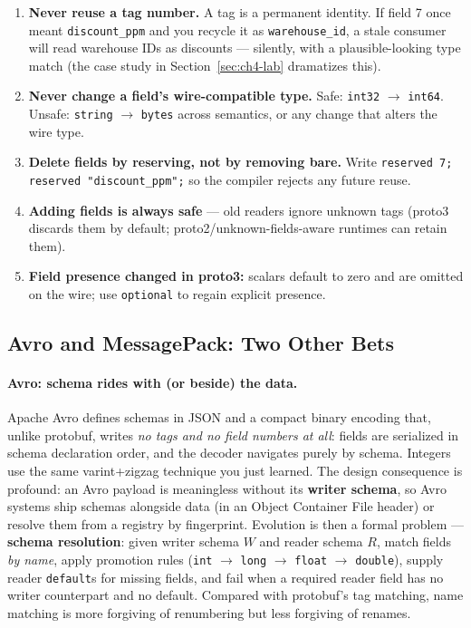 \begin{enumerate}
  \item \textbf{Never reuse a tag number.} A tag is a permanent identity. If field 7
        once meant \texttt{discount\_ppm} and you recycle it as
        \texttt{warehouse\_id}, a stale consumer will read warehouse IDs as discounts
        --- silently, with a plausible-looking type match (the case study in
        Section~\ref{sec:ch4-lab} dramatizes this).
  \item \textbf{Never change a field's wire-compatible type.} Safe: \texttt{int32}
        $\to$ \texttt{int64}. Unsafe: \texttt{string} $\to$ \texttt{bytes} across
        semantics, or any change that alters the wire type.
  \item \textbf{Delete fields by reserving, not by removing bare.} Write
        \texttt{reserved 7; reserved "discount\_ppm";} so the compiler rejects any
        future reuse.
  \item \textbf{Adding fields is always safe} --- old readers ignore unknown tags
        (proto3 discards them by default; proto2/unknown-fields-aware runtimes can
        retain them).
  \item \textbf{Field presence changed in proto3:} scalars default to zero and are
        omitted on the wire; use \texttt{optional} to regain explicit presence.
\end{enumerate}

\subsection{Avro and MessagePack: Two Other Bets}
\label{sec:ch4-avro-msgpack}

\paragraph{Avro: schema rides with (or beside) the data.}
Apache Avro defines schemas in JSON and a compact binary encoding that, unlike
protobuf, writes \emph{no tags and no field numbers at all}: fields are serialized
in schema declaration order, and the decoder navigates purely by schema. Integers
use the same varint+zigzag technique you just learned. The design consequence is
profound: an Avro payload is meaningless without its \textbf{writer schema}, so
Avro systems ship schemas alongside data (in an Object Container File header) or
resolve them from a registry by fingerprint. Evolution is then a formal problem ---
\textbf{schema resolution}: given writer schema $W$ and reader schema $R$, match
fields \emph{by name}, apply promotion rules (\texttt{int} $\to$ \texttt{long}
$\to$ \texttt{float} $\to$ \texttt{double}), supply reader \texttt{default}s for
missing fields, and fail when a required reader field has no writer counterpart and
no default. Compared with protobuf's tag matching, name matching is more forgiving of
renumbering but less forgiving of renames.

